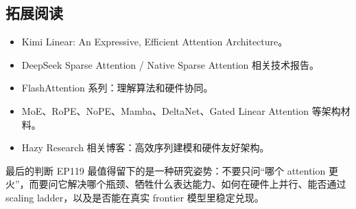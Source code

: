 \subsection{拓展阅读}

\begin{itemize}
\item Kimi Linear: An Expressive, Efficient Attention Architecture。
\item DeepSeek Sparse Attention / Native Sparse Attention 相关技术报告。
\item FlashAttention 系列：理解算法和硬件协同。
\item MoE、RoPE、NoPE、Mamba、DeltaNet、Gated Linear Attention 等架构材料。
\item Hazy Research 相关博客：高效序列建模和硬件友好架构。
\end{itemize}

\begin{importantbox}{最后的判断}
EP119 最值得留下的是一种研究姿势：不要只问“哪个 attention 更火”，而要问它解决哪个瓶颈、牺牲什么表达能力、如何在硬件上并行、能否通过 scaling ladder，以及是否能在真实 frontier 模型里稳定兑现。
\end{importantbox}


